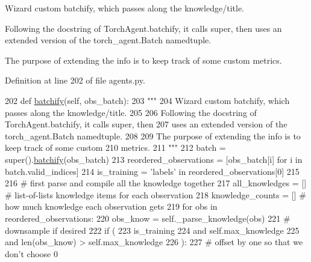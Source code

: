 \begin{DoxyVerb}Wizard custom batchify, which passes along the knowledge/title.

Following the docstring of TorchAgent.batchify, it calls super, then
uses an extended version of the torch_agent.Batch namedtuple.

The purpose of extending the info is to keep track of some custom
metrics.
\end{DoxyVerb}
 

Definition at line 202 of file agents.\+py.


\begin{DoxyCode}
202     \textcolor{keyword}{def }\hyperlink{namespaceparlai_1_1agents_1_1drqa_1_1utils_aca22dd97c5b6dcda2a7479c1cb22ef1e}{batchify}(self, obs\_batch):
203         \textcolor{stringliteral}{"""}
204 \textcolor{stringliteral}{        Wizard custom batchify, which passes along the knowledge/title.}
205 \textcolor{stringliteral}{}
206 \textcolor{stringliteral}{        Following the docstring of TorchAgent.batchify, it calls super, then}
207 \textcolor{stringliteral}{        uses an extended version of the torch\_agent.Batch namedtuple.}
208 \textcolor{stringliteral}{}
209 \textcolor{stringliteral}{        The purpose of extending the info is to keep track of some custom}
210 \textcolor{stringliteral}{        metrics.}
211 \textcolor{stringliteral}{        """}
212         batch = super().\hyperlink{namespaceparlai_1_1agents_1_1drqa_1_1utils_aca22dd97c5b6dcda2a7479c1cb22ef1e}{batchify}(obs\_batch)
213         reordered\_observations = [obs\_batch[i] \textcolor{keywordflow}{for} i \textcolor{keywordflow}{in} batch.valid\_indices]
214         is\_training = \textcolor{stringliteral}{'labels'} \textcolor{keywordflow}{in} reordered\_observations[0]
215 
216         \textcolor{comment}{# first parse and compile all the knowledge together}
217         all\_knowledges = []  \textcolor{comment}{# list-of-lists knowledge items for each observation}
218         knowledge\_counts = []  \textcolor{comment}{# how much knowledge each observation gets}
219         \textcolor{keywordflow}{for} obs \textcolor{keywordflow}{in} reordered\_observations:
220             obs\_know = self.\_parse\_knowledge(obs)
221             \textcolor{comment}{# downsample if desired}
222             \textcolor{keywordflow}{if} (
223                 is\_training
224                 \textcolor{keywordflow}{and} self.max\_knowledge
225                 \textcolor{keywordflow}{and} len(obs\_know) > self.max\_knowledge
226             ):
227                 \textcolor{comment}{# offset by one so that we don't choose 0}

\end{DoxyCode}
